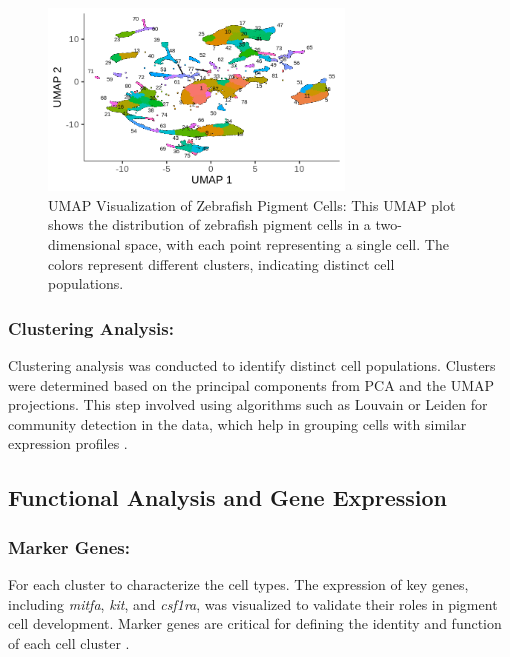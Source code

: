 \documentclass[runningheads]{llncs}
\begin{document}
\begin{figure}[htbp]
\centering
\includegraphics[height=0.3\textheight,width=0.7\textwidth]{umap.png}
\caption{UMAP Visualization of Zebrafish Pigment Cells: This UMAP plot shows the distribution of zebrafish pigment cells in a two-dimensional space, with each point representing a single cell. The colors represent different clusters, indicating distinct cell populations.}
\label{fig_umap_dimensions}
\end{figure}

\subsubsection{Clustering Analysis:} Clustering analysis was conducted to identify distinct cell populations. Clusters were determined based on the principal components from PCA and the UMAP projections. This step involved using algorithms such as Louvain or Leiden for community detection in the data, which help in grouping cells with similar expression profiles \cite{street2018slingshot}.

\subsection*{Functional Analysis and Gene Expression}
\subsubsection{Marker Genes:} For each cluster to characterize the cell types. The expression of key genes, including \textit{mitfa}, \textit{kit}, and \textit{csf1ra}, was visualized to validate their roles in pigment cell development. Marker genes are critical for defining the identity and function of each cell cluster \cite{howard2021atlas}.
\newpage
\end{document}

